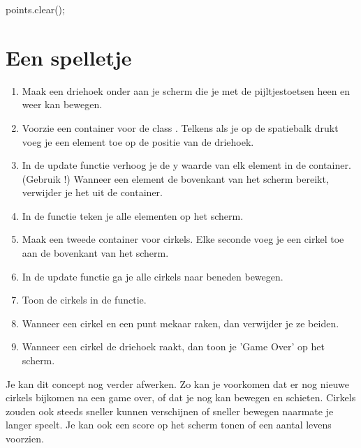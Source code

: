 \begin{code}
points.clear();
\end{code}

\section{Een spelletje}

\begin{enumerate}
\item Maak een driehoek onder aan je scherm die je met de pijltjestoetsen heen en weer kan bewegen.
\item Voorzie een container voor de class . Telkens als je op de spatiebalk drukt voeg je een element toe op de positie van de driehoek.
\item In de update functie verhoog je de y waarde van elk element in de container. (Gebruik !) Wanneer een element de bovenkant van het scherm bereikt, verwijder je het uit de container.
\item In de  functie teken je alle elementen op het scherm.
\item Maak een tweede container voor cirkels. Elke seconde voeg je een cirkel toe aan de bovenkant van het scherm.
\item In de update functie ga je alle cirkels naar beneden bewegen.
\item Toon de cirkels in de  functie.
\item Wanneer een cirkel en een punt mekaar raken, dan verwijder je ze beiden.
\item Wanneer een cirkel de driehoek raakt, dan toon je 'Game Over' op het scherm.
\end{enumerate}

Je kan dit concept nog verder afwerken. Zo kan je voorkomen dat er nog nieuwe cirkels bijkomen na een game over, of dat je nog kan bewegen en schieten. Cirkels zouden ook steeds sneller kunnen verschijnen of sneller bewegen naarmate je langer speelt. Je kan ook een score op het scherm tonen of een aantal levens voorzien.
